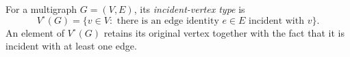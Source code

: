 \begin{definition}
For a multigraph $G=(V,E)$, its \emph{incident-vertex type} is
\[
 V^{\circ}(G)=\{v\in V:\text{ there is an edge identity }e\in E
 \text{ incident with }v\}.
\]
An element of $V^{\circ}(G)$ retains its original vertex together with the
fact that it is incident with at least one edge.
\end{definition}
